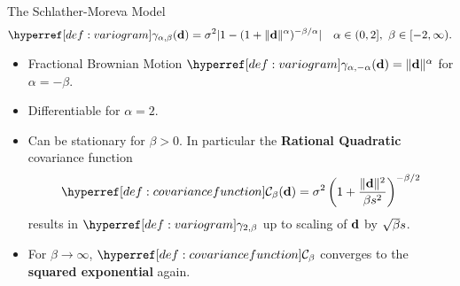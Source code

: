 \begin{frame}{The Schlather-Moreva Model}
	\begin{equation*}
		\variogram_{\alpha,\beta}(\step)
		= \sigma^2|1- (1+\|\step\|^\alpha)^{-\beta/\alpha}|
		\quad \alpha\in (0,2],\ \beta\in[-2,\infty).
	\end{equation*}
	\begin{itemize}
		\item Fractional Brownian Motion \(\variogram_{\alpha,-\alpha}(\step)=\|\step\|^\alpha\) for \(\alpha=-\beta\).
		\item Differentiable for \(\alpha=2\).
		\item Can be stationary for \(\beta>0\). In particular the
		\textbf{Rational Quadratic} covariance function
		\[
			\C_\beta(\step)
			= \sigma^2\left(1+	\frac{\|\step\|^2}{\beta\scale^2}\right)^{-\beta/2}
		\]
		results in \(\variogram_{2,\beta}\) up to scaling of \(\mathbf{d}\) by
		\(\sqrt{\beta}s\).

		\item For \(\beta\to\infty\), \(\C_\beta\) converges to the \textbf{squared
		exponential} again.
	\end{itemize}
\end{frame}